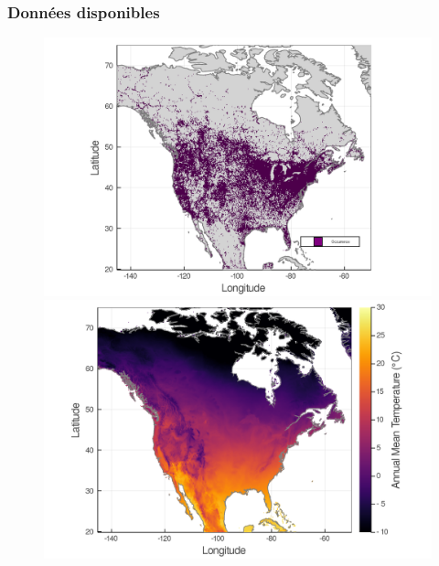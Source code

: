 \documentclass[10pt]{beamer}
\begin{document}
\begin{frame}
  \frametitle{Données disponibles}
  \begin{figure}
    \centering
    \hspace*{-0.5cm}\includegraphics[scale=0.08]{fig/01_raw_singlesp.png}
    \hspace*{0.5cm}\includegraphics[scale=0.08]{fig/wc_temp.png}
  \end{figure}
\end{frame}
\end{document}
